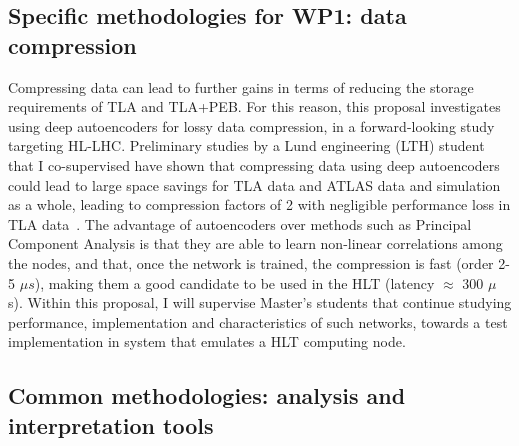 \subsection{Specific methodologies for WP1: data compression}
\label{sub:SpecificMethodsCompression}

Compressing data can lead to further gains in terms of reducing the storage requirements of TLA and TLA+PEB. 
For this reason, this proposal investigates using deep autoencoders for lossy data compression, in a forward-looking study targeting HL-LHC. 
Preliminary studies by a Lund engineering (LTH) student that I co-supervised have shown that compressing data using deep autoencoders could lead to large space savings for TLA data and ATLAS data and simulation as a whole, leading to compression factors of 2 with negligible performance loss in TLA data~\cite{ToBeCited}. %
The advantage of autoencoders over methods such as Principal Component Analysis is that they are able to learn non-linear correlations among the nodes, 
and that, once the network is trained, the compression is fast (order 2-5 $\mu s$), making them a good candidate to be used in the HLT (latency $\approx$ 300 $\mu$ s). 
Within this proposal, I will supervise Master's students that continue studying performance, implementation and characteristics of such networks, towards a test implementation in system that emulates a HLT computing node. 


\subsection{Common methodologies: analysis and interpretation tools}
\label{sub:CommonMethodsAnalysisTools}

